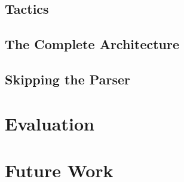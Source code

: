 \documentclass[
	msc,
	english
]{ppgccufmg}
\begin{document}
	  \section{Tactics}
	  \section{The Complete Architecture}
	  \section{Skipping the Parser}
	\chapter{Evaluation}
	\chapter{Future Work}

		
		
\end{document}
